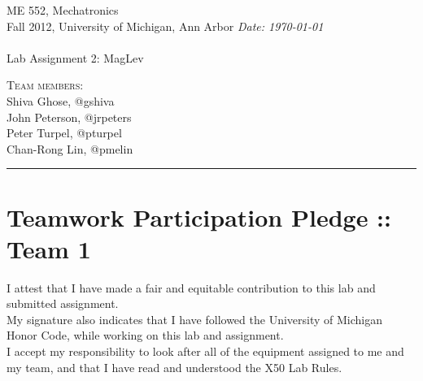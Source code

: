 \documentclass{article}
\newcommand{\shortbar}{\begin{center}\rule{5ex}{0.1pt}\end{center}}
\newcommand{\courseNumber}{ME 552}
\newcommand{\courseTitle}{Mechatronics}
\newcommand{\semester}{Fall 2012}
\theoremstyle{plain}
\theoremstyle{definition}
\theoremstyle{remark}
\newenvironment{solution}[1]{\medskip\noindent{\bf Problem #1.~}}{\shortbar}
\newcommand{\solutions}[4]{
\vspace{-2ex}
\begin{center}
{\small  \courseNumber, \courseTitle
\hfill {\Large \bf {#1} }\\
\semester, University of Michigan, Ann Arbor \hfill
{\em Date: #3}}\\
\vspace{-1ex}
\hrulefill\\
\vspace{4ex}
{\LARGE Lab Assignment #2}\\
\vspace{2ex}
\end{center}
\begin{trivlist}
\item \textsc{Team members:\\} {#4}
\end{trivlist}
\noindent
\shortbar
\vspace{3ex}
}
\begin{document}
\solutions{}{2: MagLev}{\today}{Shiva Ghose, @gshiva\\ John Peterson, @jrpeters\\ Peter Turpel, @pturpel\\ Chan-Rong Lin, @pmelin}
%
%
\section*{Teamwork Participation Pledge :: Team 1}

I attest that I have made a fair and equitable contribution to this lab and submitted 
assignment. \\

My signature also indicates that I have followed the University of Michigan Honor Code, 
while working on this lab and assignment.\\

I accept my responsibility to look after all of the equipment assigned to me and my team, 
and that I have read and understood the X50 Lab Rules.\\
\end{document}
